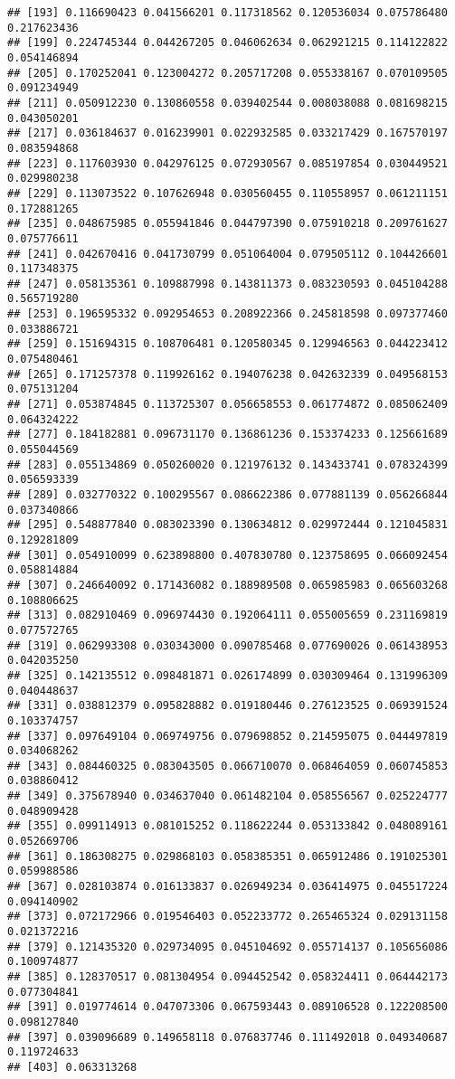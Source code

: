 \documentclass[
]{article}
\begin{document}
\begin{verbatim}
## [193] 0.116690423 0.041566201 0.117318562 0.120536034 0.075786480 0.217623436
## [199] 0.224745344 0.044267205 0.046062634 0.062921215 0.114122822 0.054146894
## [205] 0.170252041 0.123004272 0.205717208 0.055338167 0.070109505 0.091234949
## [211] 0.050912230 0.130860558 0.039402544 0.008038088 0.081698215 0.043050201
## [217] 0.036184637 0.016239901 0.022932585 0.033217429 0.167570197 0.083594868
## [223] 0.117603930 0.042976125 0.072930567 0.085197854 0.030449521 0.029980238
## [229] 0.113073522 0.107626948 0.030560455 0.110558957 0.061211151 0.172881265
## [235] 0.048675985 0.055941846 0.044797390 0.075910218 0.209761627 0.075776611
## [241] 0.042670416 0.041730799 0.051064004 0.079505112 0.104426601 0.117348375
## [247] 0.058135361 0.109887998 0.143811373 0.083230593 0.045104288 0.565719280
## [253] 0.196595332 0.092954653 0.208922366 0.245818598 0.097377460 0.033886721
## [259] 0.151694315 0.108706481 0.120580345 0.129946563 0.044223412 0.075480461
## [265] 0.171257378 0.119926162 0.194076238 0.042632339 0.049568153 0.075131204
## [271] 0.053874845 0.113725307 0.056658553 0.061774872 0.085062409 0.064324222
## [277] 0.184182881 0.096731170 0.136861236 0.153374233 0.125661689 0.055044569
## [283] 0.055134869 0.050260020 0.121976132 0.143433741 0.078324399 0.056593339
## [289] 0.032770322 0.100295567 0.086622386 0.077881139 0.056266844 0.037340866
## [295] 0.548877840 0.083023390 0.130634812 0.029972444 0.121045831 0.129281809
## [301] 0.054910099 0.623898800 0.407830780 0.123758695 0.066092454 0.058814884
## [307] 0.246640092 0.171436082 0.188989508 0.065985983 0.065603268 0.108806625
## [313] 0.082910469 0.096974430 0.192064111 0.055005659 0.231169819 0.077572765
## [319] 0.062993308 0.030343000 0.090785468 0.077690026 0.061438953 0.042035250
## [325] 0.142135512 0.098481871 0.026174899 0.030309464 0.131996309 0.040448637
## [331] 0.038812379 0.095828882 0.019180446 0.276123525 0.069391524 0.103374757
## [337] 0.097649104 0.069749756 0.079698852 0.214595075 0.044497819 0.034068262
## [343] 0.084460325 0.083043505 0.066710070 0.068464059 0.060745853 0.038860412
## [349] 0.375678940 0.034637040 0.061482104 0.058556567 0.025224777 0.048909428
## [355] 0.099114913 0.081015252 0.118622244 0.053133842 0.048089161 0.052669706
## [361] 0.186308275 0.029868103 0.058385351 0.065912486 0.191025301 0.059988586
## [367] 0.028103874 0.016133837 0.026949234 0.036414975 0.045517224 0.094140902
## [373] 0.072172966 0.019546403 0.052233772 0.265465324 0.029131158 0.021372216
## [379] 0.121435320 0.029734095 0.045104692 0.055714137 0.105656086 0.100974877
## [385] 0.128370517 0.081304954 0.094452542 0.058324411 0.064442173 0.077304841
## [391] 0.019774614 0.047073306 0.067593443 0.089106528 0.122208500 0.098127840
## [397] 0.039096689 0.149658118 0.076837746 0.111492018 0.049340687 0.119724633
## [403] 0.063313268
\end{verbatim}
\end{document}
